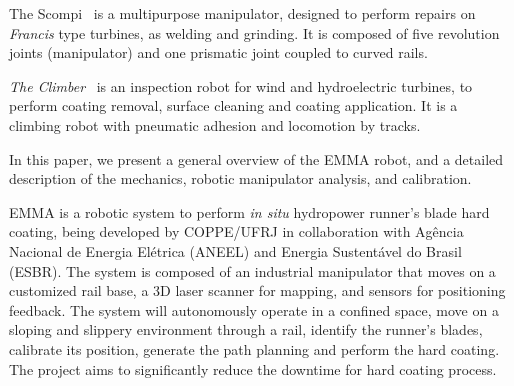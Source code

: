The Scompi~\cite{scompi} is a multipurpose manipulator, designed to
perform repairs on \textit{Francis} type turbines, as welding and grinding. It
is composed of five revolution joints (manipulator) and one prismatic joint
coupled to curved rails.

\textit{The Climber}~\cite{icm} is an inspection robot for wind and
hydroelectric turbines, to perform coating removal, surface cleaning and
coating application. It is a climbing robot with pneumatic adhesion and
locomotion by tracks.

In this paper, we present a general overview of the EMMA robot, and a detailed
description of the mechanics, robotic manipulator analysis, and calibration.

EMMA is a robotic system to perform \textit{in situ} hydropower runner's
blade hard coating, being developed by COPPE/UFRJ in collaboration with Agência
Nacional de Energia Elétrica (ANEEL) and Energia Sustentável do Brasil (ESBR). The system
is composed of an industrial manipulator that moves on a customized rail base, a
3D laser scanner for mapping, and sensors for positioning feedback. The
system will autonomously operate in a confined space, move on a sloping
and slippery environment through a rail, identify the runner's blades, calibrate
its position, generate the path planning and perform the hard coating. The
project aims to significantly reduce the downtime for hard coating process.

\begin{comment}
This text is organized as follows: a general overview of the robot and its main
challenges are presented in Section \ref{sec:general_overview}, detailed
descriptions of the embedded electronics, the vehicle support system, power
supply system, and software architecture are taken in
Sections \ref{sec:electronics_overview}, \ref{sec:powersupply_overview}, and
\ref{sec:software} respectively.
In Section \ref{sec:results}, preliminary results are shown, and concluding
remarks are drawn in Section \ref{sec:conclusions}.
\end{comment}